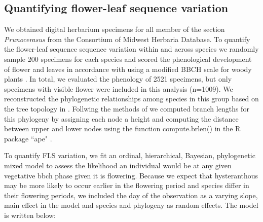 \documentclass{article}\usepackage[]{graphicx}\usepackage[]{color}
\begin{document}

\subsection{Quantifying flower-leaf sequence variation}
We obtained digital herbarium specimens for all member of the section \textit{Prunocerasus} from the Consortium of Midwest Herbaria Database. To quantify the flower-leaf sequence sequence variation within and across species we randomly sample 200 specimens for each species and scored the phenological development of flower and leaves in accordance with using a modified BBCH scale for woody plants \citep{Finn2007}. In total, we evaluated the phenology of 2521 specimens, but only specimens with visible flower were included in this analysis (n=1009). We reconstructed the phylogenetic relationships among species in this group based on the tree topology in \citet{Shaw:2004aa}. Follwing the methods of \citet{Granfen1989} we computed branch lengths for this phylogeny by assigning each node a height and computing the distance between upper and lower nodes using the function compute.brlen() in the R package ``ape" \citep{}.

To quantify FLS variation, we fit an ordinal, hierarchical, Bayesian, phylogenetic mixed model \citep{Garamszegi2014} to assess the likelihood an individual would be at any given vegetative bbch phase given it is flowering. Because we expect that hysteranthous may be more likely to occur earlier in the flowering period and species differ in their flowering periods, we included the day of the observation as a varying slope, main effect in the model and species and phylogeny as random effects. The model is written below:\\
\end{document}

